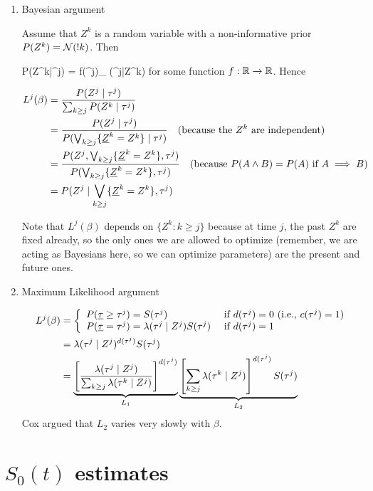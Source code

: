 \begin{enumerate}
\item Bayesian argument

Assume that $Z^{k}$ is a random variable
with a non-informative prior $P(Z^{k})={\cal N}(!k)$.
Then

\beq
P(Z^{k}|\tau^{j}) = f(\tau^j)_
{\lam(\tau^j|Z^{k})}
\eeq
for some function $f:{ \mathbb{R}}\rightarrow { \mathbb{R}}$.
Hence

\begin{align}
 L^j (\beta)&=
\frac{ P(Z^j\mid\tau^{j})}
{\sum_{k\geq j}P(Z^{k}\mid\tau^{j})}
\\
&=
\frac{ P(Z^j\mid\tau^{j})}
{P(\bigV_{k\geq j}\{\ul{Z}^{k}=Z^k\}\mid\tau^{j})}
\quad\text{(because the $Z^k$ are independent)}
\\
&=
\frac{ P(Z^j,\bigV_{k\geq j}\{\ul{Z}^{k}=Z^k\},\tau^{j})}
{P(\bigV_{k\geq j}\{\ul{Z}^{k}=Z^k\},\tau^{j})}
\quad\text{(because $P(A \A B) = P(A)$ if $A \implies B$)}
\\
&=
P(Z^j\mid \bigV_{k\geq j}\{\ul{Z}^{k}=Z^k\},\tau^{j})
\end{align}

Note that $ L^j(\beta)$ depends
on $\{Z^k: k\geq j\}$ because at time $j$,
the past $Z^k$ are fixed already,
so the only ones we are allowed
to optimize (remember, we are acting as
Bayesians here, so we can  optimize parameters)
 are the present and future ones.
\item Maximum Likelihood argument

\begin{align}
 L^j(\beta)&=
\left\{
\begin{array}{ll}
P(\rvtau\geq \tau^j) =S(\tau^j)
& \text{ if $d(\tau^j)=0$ (i.e., $c(\tau^j)=1$)}
\\
 P(\rvtau=\tau^j)=
 \lam(\tau^j\mid Z^j) S(\tau^j)
  & \text{ if $d(\tau^j)=1$ }
 \end{array}\right.
 \\
 &=
 \lam(\tau^j\mid Z^j)^{d(\tau^j)} S(\tau^j)
 \\
 &=
\underbrace{\left[\frac{\lam(\tau^j\mid Z^j)}
{\sum_{k\geq j} \lam(\tau^k\mid Z^j)}
\right]^{d(\tau^j)}
}_{L_1}
\underbrace{
\left[
\sum_{k\geq j} \lam(\tau^k\mid Z^j)
\right]^{d(\tau^j)}
S(\tau^j)
}_{L_2}
\end{align}
Cox argued that $L_2$ varies very slowly
with $\beta$.
\end{enumerate}


\section{$S_0(t)$ estimates}

